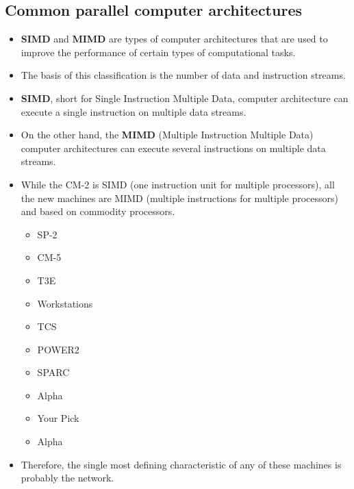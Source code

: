 \documentclass[12pt, a4paper]{book}
\begin{document}
\subsection{Common parallel computer architectures \cite{SIMD-and-MIMD}}
\begin{itemize}
    \item \textbf{SIMD} and \textbf{MIMD} are types of computer architectures that are used to improve the performance of certain types of computational tasks.
    \item The basis of this classification is the number of data and instruction streams.
    \item \textbf{SIMD}, short for Single Instruction Multiple Data, computer architecture can execute a single instruction on multiple data streams.
    \item On the other hand, the \textbf{MIMD} (Multiple Instruction Multiple Data) computer architectures can execute several instructions on multiple data streams.
    \item While the CM-2 is SIMD (one instruction unit for multiple processors), all
          the new machines are MIMD (multiple instructions for multiple
          processors) and based on commodity processors.\\
          \begin{minipage}{0.5\linewidth}
              \begin{itemize}
                  \item SP-2
                  \item CM-5
                  \item T3E
                  \item Workstations
                  \item TCS
              \end{itemize}
          \end{minipage}
          \begin{minipage}{0.5\linewidth}
              \begin{itemize}
                  \item POWER2
                  \item SPARC
                  \item Alpha
                  \item Your Pick
                  \item Alpha
              \end{itemize}
          \end{minipage}
    \item Therefore, the single most defining characteristic of any of these machines
          is probably the network.
\end{itemize}
\end{document}
